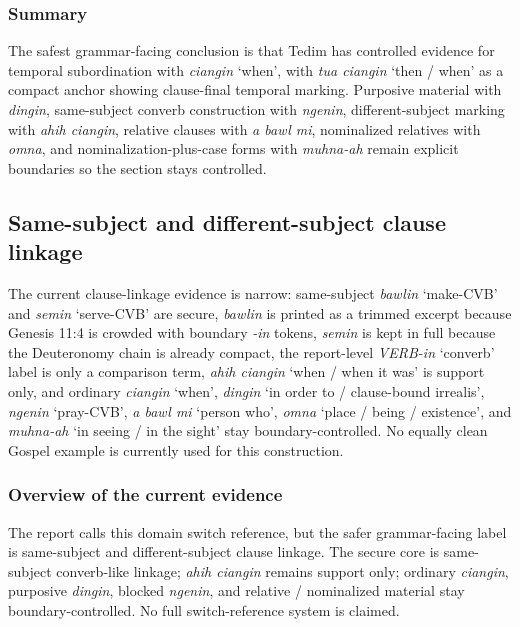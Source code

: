 \documentclass[
  11pt,
  a4paper,
]{article}
\newcommand{\tdim}[1]{\textit{#1}}
\newcommand{\glossquote}[1]{`#1'}
\begin{document}
\subsubsection{Summary}\label{summary-11}

The safest grammar-facing conclusion is that Tedim has controlled
evidence for temporal subordination with \tdim{ciangin}
\glossquote{when}, with \tdim{tua ciangin} \glossquote{then / when} as a
compact anchor showing clause-final temporal marking. Purposive material
with \tdim{dingin}, same-subject converb construction with
\tdim{ngenin}, different-subject marking with \tdim{ahih ciangin},
relative clauses with \tdim{a bawl mi}, nominalized relatives with
\tdim{omna}, and nominalization-plus-case forms with \tdim{muhna-ah}
remain explicit boundaries so the section stays controlled.

\subsection{Same-subject and different-subject clause
linkage}\label{same-subject-and-different-subject-clause-linkage}

The current clause-linkage evidence is narrow: same-subject
\tdim{bawlin} \glossquote{make-CVB} and \tdim{semin}
\glossquote{serve-CVB} are secure, \tdim{bawlin} is printed as a trimmed
excerpt because Genesis 11:4 is crowded with boundary \tdim{-in} tokens,
\tdim{semin} is kept in full because the Deuteronomy chain is already
compact, the report-level \tdim{VERB-in} \glossquote{converb} label is
only a comparison term, \tdim{ahih ciangin}
\glossquote{when / when it was} is support only, and ordinary
\tdim{ciangin} \glossquote{when}, \tdim{dingin}
\glossquote{in order to / clause-bound irrealis}, \tdim{ngenin}
\glossquote{pray-CVB}, \tdim{a bawl mi} \glossquote{person who},
\tdim{omna} \glossquote{place / being / existence}, and \tdim{muhna-ah}
\glossquote{in seeing / in the sight} stay boundary-controlled. No
equally clean Gospel example is currently used for this construction.

\subsubsection{Overview of the current
evidence}\label{overview-of-the-current-evidence}

The report calls this domain switch reference, but the safer
grammar-facing label is same-subject and different-subject clause
linkage. The secure core is same-subject converb-like linkage;
\tdim{ahih ciangin} remains support only; ordinary \tdim{ciangin},
purposive \tdim{dingin}, blocked \tdim{ngenin}, and relative /
nominalized material stay boundary-controlled. No full switch-reference
system is claimed.
\end{document}
